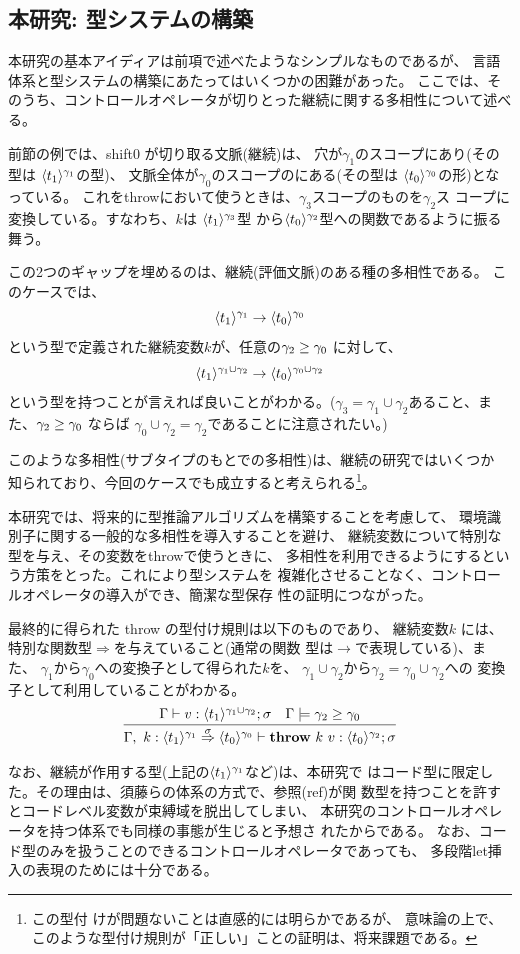 \subsection{本研究: 型システムの構築}

本研究の基本アイディアは前項で述べたようなシンプルなものであるが、
言語体系と型システムの構築にあたってはいくつかの困難があった。
ここでは、そのうち、コントロールオペレータが切りとった継続に関する多相性について述べる。

前節の例では、shift0 が切り取る文脈(継続)は、
穴が$\gamma_1$のスコープにあり(その型は $\langle{t_1}\rangle^{\gamma_1}$の型)、
文脈全体が$\gamma_0$のスコープのにある(その型は
$\langle{t_0}\rangle^{\gamma_0}$の形)となっている。
これをthrowにおいて使うときは、$\gamma_3$スコープのものを$\gamma_2$ス
コープに変換している。すなわち、$k$は $\langle{t_1}\rangle^{\gamma_3}$型
から$\langle{t_0}\rangle^{\gamma_2}$型への関数であるように振る舞う。

この2つのギャップを埋めるのは、継続(評価文脈)のある種の多相性である。
このケースでは、
\[\langle{t_1}\rangle^{\gamma_1} \to \langle{t_0}\rangle^{\gamma_0} \]
という型で定義された継続変数$k$が、任意の$\gamma_2 \ge \gamma_0$ に対して、
\[\langle{t_1}\rangle^{\gamma_1 \cup \gamma_2} \to \langle{t_0}\rangle^{\gamma_0 \cup \gamma_2} \]
という型を持つことが言えれば良いことがわかる。($\gamma_3 = \gamma_1
\cup \gamma_2$あること、また、$\gamma_2 \ge \gamma_0$ ならば
$\gamma_0 \cup \gamma_2 = \gamma_2$であることに注意されたい。)

このような多相性(サブタイプのもとでの多相性)は、継続の研究ではいくつか
知られており、今回のケースでも成立すると考えられる\footnote{この型付
けが問題ないことは直感的には明らかであるが、
意味論の上で、このような型付け規則が「正しい」ことの証明は、将来課題である。}。

本研究では、将来的に型推論アルゴリズムを構築することを考慮して、
環境識別子に関する一般的な多相性を導入することを避け、
継続変数について特別な型を与え、その変数をthrowで使うときに、
多相性を利用できるようにするという方策をとった。これにより型システムを
複雑化させることなく、コントロールオペレータの導入ができ、簡潔な型保存
性の証明につながった。

最終的に得られた throw の型付け規則は以下のものであり、
継続変数$k$ には、特別な関数型$\Rightarrow$を与えていること(通常の関数
型は$\rightarrow$で表現している)、また、
$\gamma_1$から$\gamma_0$への変換子として得られた$k$を、
$\gamma_1\cup \gamma_2$から$\gamma_2 = \gamma_0 \cup \gamma_2$への
変換子として利用していることがわかる。
\[
  \infer
  {\Gamma,~k:\contT{\codeT{t_1}{\gamma_1}}{\codeT{t_0}{\gamma_0}}{\sigma}
    \vdash \throw{k}{v} : \codeT{t_0}{\gamma_2} ; \sigma}
  {\Gamma
    \vdash v : \codeT{t_1}{\gamma_1 \cup \gamma_2} ; \sigma
    & \Gamma \models \gamma_2 \ord \gamma_0
  }
\]

なお、継続が作用する型(上記の$\langle{t_1}\rangle^{\gamma_1}$など)は、本研究で
はコード型に限定した。その理由は、須藤らの体系の方式で、参照(ref)が関
数型を持つことを許すとコードレベル変数が束縛域を脱出してしまい、
本研究のコントロールオペレータを持つ体系でも同様の事態が生じると予想さ
れたからである。
なお、コード型のみを扱うことのできるコントロールオペレータであっても、
多段階let挿入の表現のためには十分である。

